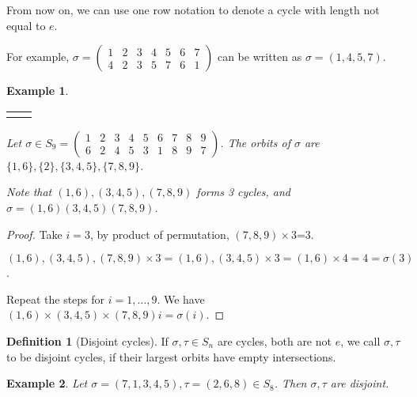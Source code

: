 \documentclass{article}
\theoremstyle{MyNonumberplain}
\theoremstyle{break}
\newtheorem*{proof}{Proof. }
\newcommand{\nline}{\begin{tabular}{ll}&\\\end{tabular}}
\theoremstyle{break}
\newtheorem{example}{Example}[section]
\theoremstyle{break}
\theoremstyle{definition}
\theoremstyle{break}
\newtheorem{definition}{Definition}[section]
\begin{document}
From now on, we can use one row notation to denote a cycle with length not
equal to $e$.

For example, $\sigma = \left(\begin{array}{ccccccc}
  1 & 2 & 3 & 4 & 5 & 6 & 7\\
  4 & 2 & 3 & 5 & 7 & 6 & 1
\end{array}\right)$ can be written as $\sigma = (1, 4, 5, 7)$. 


\begin{expbox}
    \begin{example}

        \nline

        Let $\sigma \in S_9 = \left(\begin{array}{ccccccccc}
            1 & 2 & 3 & 4 & 5 & 6 & 7 & 8 & 9\\
            6 & 2 & 4 & 5 & 3 & 1 & 8 & 9 & 7
          \end{array}\right)$. The orbits of $\sigma$ are $\{ 1, 6 \}, \{ 2 \}, \{ 3, 4,
          5 \}, \{ 7, 8, 9 \}$.\bigskip
          
          Note that $(1, 6), (3, 4, 5), (7, 8, 9)$ forms 3 cycles, and $\sigma = (1, 6)
          (3, 4, 5)(7, 8, 9)$.
    \end{example}
    \begin{prfbox}
        \begin{proof}
            Take $i = 3$, by product of permutation, $(7, 8, 9) \times 3$=3.\bigskip

            $(1, 6), (3, 4, 5), (7, 8, 9) \times 3 = (1, 6), (3, 4, 5) \times 3 = (1, 6)
            \times 4 = 4 = \sigma (3)$.\bigskip

            Repeat the steps for $i = 1, \ldots, 9$. We have $(1, 6) \times (3, 4, 5) \times
            (7, 8, 9) i = \sigma (i)$.
        \end{proof}
    \end{prfbox}
\end{expbox}

\begin{defbox}
    \begin{definition}[Disjoint cycles]
        If $\sigma, \tau \in S_n$ are cycles, both are not $e$, we call $\sigma, \tau$ to be disjoint cycles, if their largest orbits have empty intersections.
    \end{definition}
\end{defbox}

\begin{expbox}
    \begin{example}
        Let $\sigma = (7, 1, 3, 4, 5), \tau = (2, 6, 8) \in S_8$. Then $\sigma, \tau$ are disjoint.
    \end{example}
\end{expbox}
\end{document}
